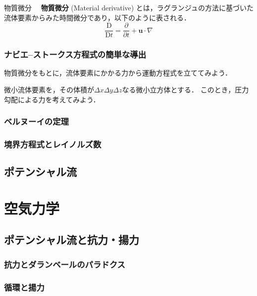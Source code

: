 \documentclass[uplatex,dvipdfmx,a4j,11pt]{jsreport}
\newcommand{\keyword}[1]{\textcolor{mainblue}{\textbf{#1}}}
\newcommand{\Diff}{\mathrm{D}} %
\numberwithin{equation}{chapter}
\begin{document}
\begin{definition}{物質微分}{}{}
  　\keyword{物質微分} (Material derivative) とは，ラグランジュの方法に基づいた流体要素からみた時間微分であり，以下のように表される．
    \begin{equation}
      \frac{\Diff}{\Diff t} = \frac{\partial }{\partial t} + \mathbf{u}\cdot \nabla
    \end{equation}
\end{definition}

\subsection{ナビエ--ストークス方程式の簡単な導出}

物質微分をもとに，流体要素にかかる力から運動方程式を立ててみよう．

微小流体要素を，その体積が$\Delta x \Delta y \Delta z$なる微小立方体とする．
このとき，圧力勾配による力を考えてみよう．







\subsection{ベルヌーイの定理}

\subsection{境界方程式とレイノルズ数}

\section{ポテンシャル流}

\chapter{空気力学}

\section{ポテンシャル流と抗力・揚力}
\subsection{抗力とダランベールのパラドクス}

\subsection{循環と揚力}
\end{document}

